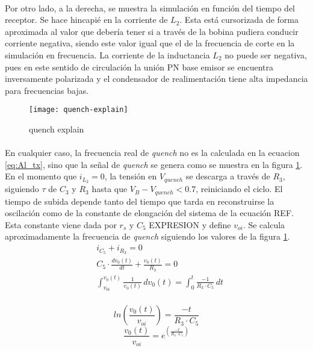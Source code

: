 \paragraph{}
Por otro lado, a la derecha, se muestra la simulación en función del tiempo del receptor. Se hace hincapié en la corriente de $L_2$. Esta está cursorizada de forma aproximada al valor que debería tener si a través de la bobina pudiera conducir corriente negativa, siendo este valor igual que el de la frecuencia de corte en la simulaci\'on en frecuencia.
La corriente de la inductancia $L_2$ no puede ser negativa, pues en este sentido de circulación la unión PN base emisor se encuentra inversamente polarizada y el condensador de realimentación tiene alta impedancia para frecuencias bajas. 

\begin{figure}[h!]
    \centering
    \texttt{[image: quench-explain]}
    \caption{quench explain}
    \label{fig:quench-explain}
\end{figure}

\paragraph{}
En cualquier caso, la frecuencia real de \textit{quench} no es la calculada en la ecuacion \ref{eq:Al_tx}, sino que la señal de \textit{quench} se genera como se muestra en la figura \ref{fig:quench-explain}. 
En el momento que $i_{L_2} = 0$, la tensión en $V_{quench}$ se descarga a trav\'es de $R_3$, siguiendo $\tau$ de $C_3$ y $R_3$ hasta que $V_B - V_{quench} < 0.7$, reiniciando el ciclo.
El tiempo de subida depende tanto del tiempo que tarda en reconstruirse la oscilaci\'on como de la constante de elongación del sistema de la ecuación REF. Esta constante viene dada por $r_s$ y $C_5$ EXPRESION y define $v_{oi}$.
Se calcula aproximadamente la frecuencia de \textit{quench} siguiendo los valores de la figura \ref{fig:quench-explain}. 
\begin{align*} 
   &i_{C_5} + i_{R_3} = 0 \\
   &C_5 \cdot \frac{dv_0(t)}{dt} + \frac{v_0(t)}{R_3} = 0 \\
   &\int_{v_{0i}}^{v_0(t)} \frac{1}{v_0(t)} \, dv_0(t) = \int_{0}^{t} \frac{-1}{R_3 \cdot C_5} \, dt \\
\end{align*}

\begin{equation}
   \label{eq:des_rx-rc}
   ln \left( \frac{v_0(t)}{v_{oi}} \right) = \frac{-t}{R_3 \cdot C_5}
\end{equation}
\begin{equation}
   \frac{v_0(t)}{v_{oi}} = e^{\left( \frac{-t}{R_3 \cdot C_5} \right)}
\end{equation}

